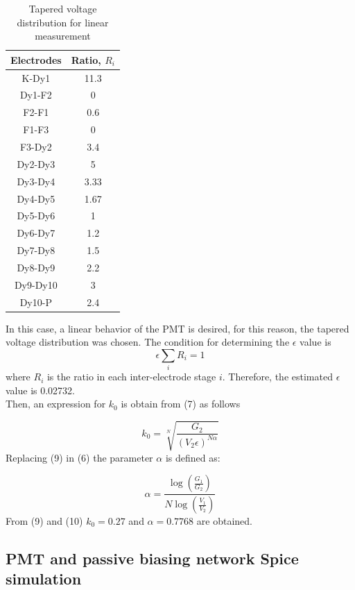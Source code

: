 \documentclass[letterpaper, 10 pt, conference]{ieeeconf}  %
\begin{document}
\begin{table}[ht]
\centering
  \caption{ Tapered voltage distribution for linear measurement}
  \begin{tabular}{ | c | c |}
    \hline
    Electrodes & Ratio, $R_i$  \\ \hline
    K-Dy1 & 11.3  \\ \hline
    Dy1-F2 & 0  \\ \hline
    F2-F1 &  0.6 \\ \hline
    F1-F3 & 0 \\ \hline
    F3-Dy2 & 3.4 \\ \hline
    Dy2-Dy3 & 5 \\ \hline
    Dy3-Dy4 & 3.33 \\ \hline
    Dy4-Dy5 & 1.67  \\ \hline
    Dy5-Dy6 & 1  \\ \hline
    Dy6-Dy7 & 1.2  \\ \hline
    Dy7-Dy8 & 1.5  \\ \hline
    Dy8-Dy9 & 2.2  \\ \hline
    Dy9-Dy10 & 3  \\ \hline
    Dy10-P & 2.4  \\
    \hline
  \end{tabular}
  \label{net}
\end{table}

In this case, a linear behavior of the PMT is desired, for this reason, the tapered voltage distribution was chosen. The condition for determining the $\epsilon$ value is
\begin{equation}
\epsilon  \sum_i R_i = 1
\end{equation}
where $R_i$ is the ratio in each inter-electrode stage $i$. Therefore, the estimated $\epsilon$ value is 0.02732.\\

Then, an expression for $k_0$ is obtain from (7) as follows

\begin{equation}
k_0=\sqrt[N]{\frac{G_2}{(V_2\epsilon)^{N \alpha}}}
\end{equation}
Replacing (9) in (6) the parameter $\alpha$ is defined as:

\begin{equation}
\alpha=\frac{\log \left( \frac{G_1}{G_2} \right)}{N \log \left( \frac{V_1}{V_2} \right)}
\end{equation}
From (9) and (10) $k_0=0.27$ and $\alpha= 0.7768$ are obtained.


\subsection{PMT and passive biasing network Spice simulation}
\end{document}
